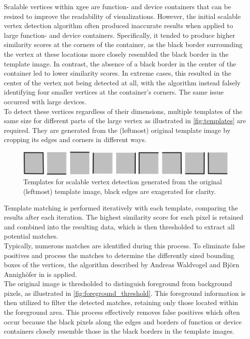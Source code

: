 Scalable vertices within \acrshort{xgee} are function- and device containers that can be resized to improve the readability of visualizations. However, the initial scalable vertex detection algorithm often produced inaccurate results when applied to large function- and device containers. Specifically, it tended to produce higher similarity scores at the corners of the container, as the black border surrounding the vertex at these locations more closely resembled the black border in the template image. In contrast, the absence of a black border in the center of the container led to lower similarity scores. In extreme cases, this resulted in the center of the vertex not being detected at all, with the algorithm instead falsely identifying four smaller vertices at the container's corners. The same issue occurred with large devices.\\
To detect these vertices regardless of their dimensions, multiple templates of the same size for different parts of the large vertex as illustrated in \autoref{fig:templates} are required. They are generated from the (leftmost) original template image by cropping its edges and corners in different ways.
\begin{figure}[ht]
    \centering
    \includegraphics[width=0.85\linewidth]{pictures/templates.png}
    \caption[Template matching template generation]{Templates for scalable vertex detection generated from the original (leftmost) template image, black edges are exagerated for clarity.}
    \label{fig:templates}
\end{figure}
Template matching is performed iteratively with each template, comparing the results after each iteration. The highest similarity score for each pixel is retained and combined into the resulting data, which is then thresholded to extract all potential matches.\\
Typically, numerous matches are identified during this process. To eliminate false positives and process the matches to determine the differently sized bounding boxes of the vertices, the algorithm described by Andreas Waldvogel and Bj{\"o}rn Annigh{\"o}fer in \cite{waldvogel_annighoefer_models_2024} is applied.\\
The original image is thresholded to distinguish foreground from background pixels, as illustrated in \autoref{fig:foreground_threshold}. This foreground information is then utilized to filter the detected matches, retaining only those located within the foreground area. This process effectively removes false positives which often occur because the black pixels along the edges and borders of function or device containers closely resemble those in the black borders in the template images.
